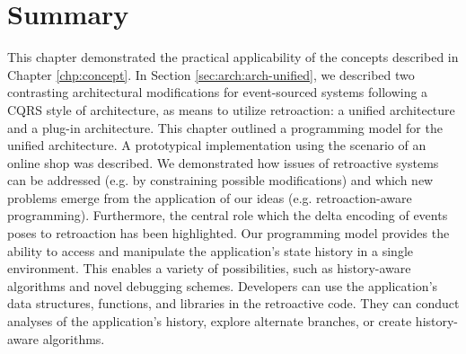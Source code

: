 \section{Summary}
This chapter demonstrated the practical applicability of the concepts described 
in Chapter \ref{chp:concept}. In Section \ref{sec:arch:arch-unified}, we 
described two contrasting architectural modifications for event-sourced systems 
following a CQRS style of architecture, as means to utilize retroaction: a 
unified architecture and a plug-in architecture.
%
This chapter outlined a programming model for the unified architecture. A 
prototypical implementation using the scenario of an online shop was described. 
We demonstrated how issues of retroactive systems can be addressed (e.g. by 
constraining possible modifications) and which new problems emerge from the 
application of our ideas (e.g. retroaction-aware programming).
%
Furthermore, the central role which the delta encoding of events poses to 
retroaction has been highlighted. Our programming model provides the ability 
to access and manipulate the application's state history in a single environment. 
This enables a variety of possibilities, such as history-aware algorithms and 
novel debugging schemes.
Developers can use the application's data structures, functions, and libraries 
in the retroactive code. They can conduct analyses of the application's history, 
explore alternate branches, or create history-aware algorithms.
